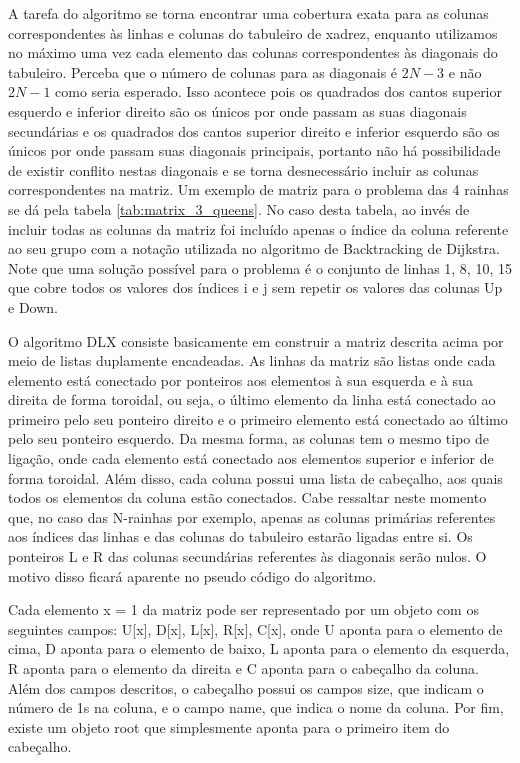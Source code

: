 \documentclass{article}
\begin{document}
A tarefa do algoritmo se torna encontrar uma cobertura exata para as colunas correspondentes às
linhas e colunas do tabuleiro de xadrez, enquanto utilizamos no máximo uma vez cada elemento das
colunas correspondentes às diagonais do tabuleiro. Perceba que o número de colunas para as diagonais
é $ 2N - 3 $ e não $ 2N - 1 $ como seria esperado. Isso acontece pois os quadrados dos cantos
superior esquerdo e inferior direito são os únicos por onde passam as suas diagonais secundárias e 
os quadrados dos cantos superior direito e inferior esquerdo são os únicos por onde passam suas diagonais
principais, portanto não há possibilidade de existir conflito nestas diagonais e se torna desnecessário incluir as colunas 
correspondentes na matriz. Um exemplo de matriz para o problema das 4 rainhas se dá pela tabela \ref{tab:matrix_3_queens}. No
caso desta tabela, ao invés de incluir todas as colunas da matriz foi incluído apenas o índice da coluna
referente ao seu grupo com a notação utilizada no algoritmo de Backtracking de Dijkstra. Note que uma solução possível para o 
problema é o conjunto de linhas { 1, 8, 10, 15 } que cobre todos os valores dos índices i e j sem repetir os valores das
colunas Up e Down.

O algoritmo DLX consiste basicamente em construir a matriz descrita acima por meio de listas duplamente encadeadas.
As linhas da matriz são listas onde cada elemento está conectado por ponteiros aos elementos à sua esquerda e à sua direita de forma 
toroidal, ou seja, o último elemento da linha está conectado ao primeiro pelo seu ponteiro direito e o primeiro elemento está conectado
ao último pelo seu ponteiro esquerdo. Da mesma forma, as colunas tem o mesmo tipo de ligação, onde cada elemento está conectado aos elementos
superior e inferior de forma toroidal. Além disso, cada coluna possui uma lista de cabeçalho, aos quais todos os elementos da coluna
estão conectados. Cabe ressaltar neste momento que, no caso das N-rainhas por exemplo, apenas as colunas primárias referentes 
aos índices das linhas e das colunas do tabuleiro estarão ligadas entre si. Os ponteiros L e R das colunas secundárias referentes às diagonais 
serão nulos. O motivo disso ficará aparente no pseudo código do algoritmo.

Cada elemento x = 1 da matriz pode ser representado por um objeto com os seguintes campos: U[x], D[x], L[x], R[x], C[x], onde
U aponta para o elemento de cima, D aponta para o elemento de baixo, L aponta para o elemento da esquerda, R aponta para o elemento da direita e
C aponta para o cabeçalho da coluna. Além dos campos descritos, o cabeçalho possui os campos size, que indicam o número de 1s na coluna, 
e o campo name, que indica o nome da coluna. Por fim, existe um objeto root que simplesmente aponta para o primeiro item do cabeçalho.
\end{document}
